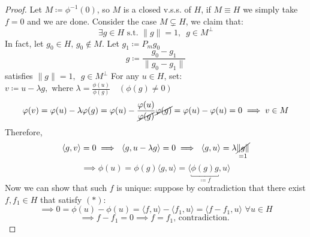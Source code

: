 \begin{proof}
    Let $M\coloneqq \phi^{-1}(0)$, so $M$ is a closed v.s.s. of $H$, if $M\equiv H $ we simply take $f=0$ and we are done.
    \newline Consider the case $M \subsetneq H$, we claim that:
    \[ \exists g \in H\mbox{ s.t. } \|g\|=1,\,\,\, g\in M^{\perp} \]
    In fact, let $g_0\in H,\,g_0 \notin M.$ Let $g_1\coloneqq P_m g_0$
    \[ g\coloneqq\displaystyle\frac{g_0-g_1}{\|g_0-g_1\|} \]
    satisfies $\|g\|=1,\,\,\, g\in M^{\perp}$
    For any $u \in H$, set:
    $ v\coloneqq u-\lambda g,\,\,\mbox{where } \lambda = \displaystyle\frac{\phi(u)}{\phi(g)} \,\,\,\,\,\,(\phi(g)\neq 0) $
    \[ \phi(v) = \phi(u) -\lambda \phi(g) =  \phi(u) - \frac{\phi(u)}{\cancel{\phi(g)}}\cancel{\phi(g)} = \phi(u)-\phi(u) = 0 \implies v \in M \]
    Therefore,
    \[ \langle  g,v\rangle=0 \implies\,\, \langle  g,u-\lambda g\rangle =0 \implies\,\, \langle g,u\rangle = \lambda\underset{=1}{\cancel{\|g\|}} \]
    \[ \implies \phi(u) = \phi(g)\langle g,u\rangle = \langle \underbracket{\phi(g)g}_{\coloneqq f},u\rangle \]
    Now we can show that such $f$ is unique: suppose by contradiction that there exist $f,f_1 \in H$ that satisfy $(*)$:
    \[ \implies 0 = \phi(u) - \phi(u) =  \langle  f,u\rangle - \langle  f_1,u\rangle = \langle  f-f_1,u\rangle\,\, \forall u\in H \]
    \[ \implies f-f_1=0 \implies f=f_1 \mbox{, contradiction.  }    \]
\end{proof}
